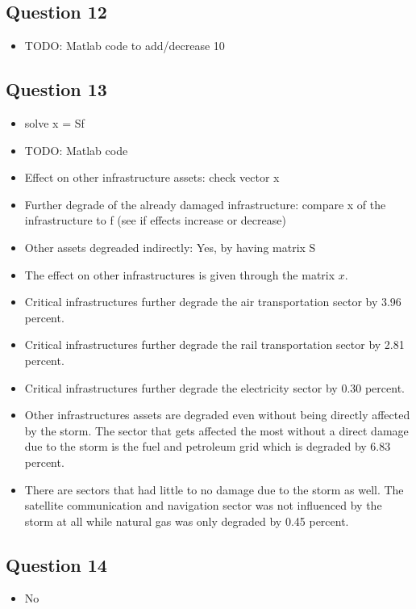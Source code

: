 \documentclass[11pt,a4paper]{article}
\begin{document}
\subsection*{Question 12}
\begin{itemize}
	\item TODO: Matlab code to add/decrease 10%
\end{itemize}

\subsection*{Question 13}
\begin{itemize}
	\item solve x = Sf
	\item TODO: Matlab code
	\item Effect on other infrastructure assets: check vector x
	\item Further degrade of the already damaged infrastructure: compare x of the infrastructure to f (see if effects increase or decrease)
	\item Other assets degreaded indirectly: Yes, by having matrix S
\end{itemize}

\begin{itemize}
	\item The effect on other infrastructures is given through the matrix $x$.
	\item Critical infrastructures further degrade the air transportation sector by 3.96 percent.
	\item Critical infrastructures further degrade the rail transportation sector by 2.81 percent.
	\item Critical infrastructures further degrade the electricity sector by 0.30 percent.
	\item Other infrastructures assets are degraded even without being directly affected by the storm. The sector that gets affected the most without a direct damage due to the storm is the fuel and petroleum grid which is degraded by 6.83 percent.
	\item There are sectors that had little to no damage due to the storm as well. The satellite communication and navigation sector was not influenced by the storm at all while natural gas was only degraded by 0.45 percent.
\end{itemize}

\subsection*{Question 14}
\begin{itemize}
	\item No
\end{itemize}
\end{document}
